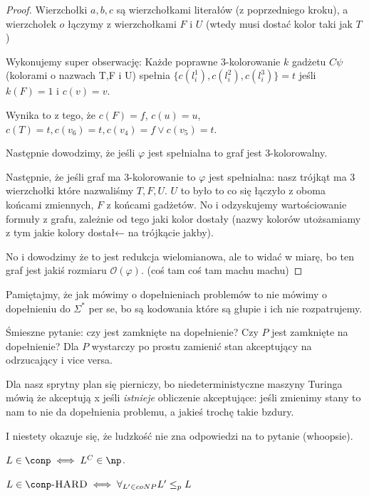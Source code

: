 \begin{proof}
    Wierzchołki \( a , b, c \) są wierzchołkami literałów (z poprzedniego kroku), a wierzchołek \( o \) łączymy z wierzchołkami \( F \) i \( U \) (wtedy musi dostać kolor taki jak \( T \))
    
    Wykonujemy super obserwację: Każde poprawne 3-kolorowanie $k$ gadżetu \(C\psi\) (kolorami o nazwach T,F i U) spełnia \(\{c(l_i^1), c(l_i^2), c(l_i^3)\} = t\) jeśli \(k(F) = 1\) i \(c(v) = v\). 
    
    Wynika to z tego, że \(c(F) = f\), \(c(u) = u\), \(c(T) = t, c(v_6) = t, c(v_4) = f \lor c(v_5) = t \).
        
    Następnie dowodzimy, że jeśli \( \varphi\) jest spełnialna to graf jest 3-kolorowalny.
    
    Następnie, że jeśli graf ma 3-kolorowanie to \( \varphi \) jest spełnialna: nasz trójkąt ma 3 wierzchołki które nazwaliśmy \(T, F, U\). \(U\) to było to co się łączyło z oboma końcami zmiennych, \(F\) z końcami gadżetów. No i odzyskujemy wartościowanie formuły z grafu, zależnie od tego jaki kolor dostały (nazwy kolorów utożsamiamy z tym jakie kolory dostał← na trójkącie jakby). 
    
    No i dowodzimy że to jest redukcja wielomianowa, ale to widać w miarę, bo ten graf jest jakiś rozmiaru \(\mathcal{O}(\varphi)\). (coś tam coś tam machu machu)
    
\end{proof}

Pamiętajmy, że jak mówimy o dopełnieniach problemów to nie mówimy o dopełnieniu do \( \Sigma^* \) per se, bo są kodowania które są głupie i ich nie rozpatrujemy. 

Śmieszne pytanie: czy \np jest zamknięte na dopełnienie? Czy \(P\) jest zamknięte na dopełnienie? Dla \(P\) wystarczy po prostu zamienić stan akceptujący na odrzucający i vice versa.

Dla \np nasz sprytny plan się pierniczy, bo niedeterministyczne maszyny Turinga mówią że akceptują x jeśli \textit{istnieje} obliczenie akceptujące: jeśli zmienimy stany to nam to nie da dopełnienia problemu, a jakieś trochę takie bzdury. 

I niestety okazuje się, że ludzkość nie zna odpowiedzi na to pytanie (whoopsie). 

\begin{definition}
     \(  L \in  \conp \iff L^C  \in \np \).
\end{definition}

\begin{definition}
     \( L \in \conp \textsc{-HARD} \iff \forall_{L' \in coNP} L' \leq_p L  \)
\end{definition}

